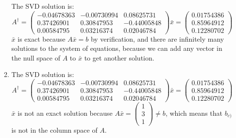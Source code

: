 \documentclass[conference,onecolumn]{IEEEtran}
\begin{document}
\begin{enumerate}[label=\arabic{enumi}.]
\begin{enumerate}
                    The SVD solution is:
                    $$
                        A^{\dagger} =
                        \begin{pmatrix}
                            -0.04678363 & -0.00730994 & 0.08625731  \\
                            0.37426901  & 0.30847953  & -0.44005848 \\
                            0.00584795  & 0.03216374  & 0.02046784
                        \end{pmatrix}
                        \bar{x} =
                        \begin{pmatrix}
                            0.01754386 \\
                            0.85964912 \\
                            0.12280702
                        \end{pmatrix}
                    $$
                    $\bar{x}$ is exact because $A \bar{x} = b$ by verification, and there are infinitely many solutions to the system of equations, because we can add any vector in the null space of $A$ to $\bar{x}$ to get another solution.
              \item The SVD solution is:
                    $$
                        A^{\dagger} =
                        \begin{pmatrix}
                            -0.04678363 & -0.00730994 & 0.08625731  \\
                            0.37426901  & 0.30847953  & -0.44005848 \\
                            0.00584795  & 0.03216374  & 0.02046784
                        \end{pmatrix}
                        \bar{x} =
                        \begin{pmatrix}
                            0.01754386 \\
                            0.85964912 \\
                            0.12280702
                        \end{pmatrix}
                    $$
                    $\bar{x}$ is not an exact solution because $A\bar{x} =
                        \begin{pmatrix}
                            1 \\
                            3 \\
                            1
                        \end{pmatrix} \neq b$, which means that $b_{c)}$ is not in the column space of $A$.


\end{enumerate}
\end{enumerate}
\end{document}
